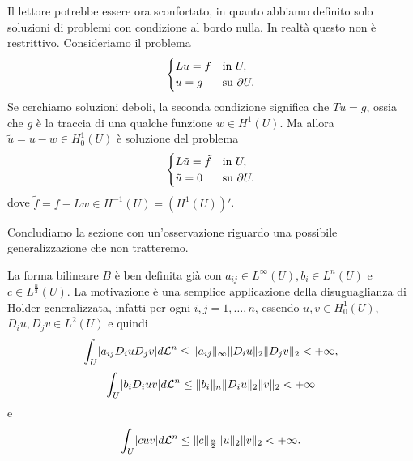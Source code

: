 \begin{osservazione}
	Il lettore potrebbe essere ora sconfortato, in quanto abbiamo definito solo soluzioni di problemi con condizione al bordo nulla. In realtà questo non è restrittivo. Consideriamo il problema
	\[ \begin{cases}
		Lu = f & \textup{in } U,\\
		u = g & \textup{su } \partial U.
	\end{cases} \]
	Se cerchiamo soluzioni deboli, la seconda condizione significa che $Tu = g$, ossia che $g$ è la traccia di una qualche funzione $w \in H^1(U)$. Ma allora $\tilde{u} = u-w \in H^1_0(U)$ è soluzione del problema
	\[ \begin{cases}
		L\tilde{u} = \tilde{f}& \textup{in } U,\\
		\tilde{u} = 0 & \textup{su } \partial U.
	\end{cases} \]
	dove $\tilde{f} = f - Lw \in H^{-1}(U) = (H^1(U))'$.
\end{osservazione}

Concludiamo la sezione con un'osservazione riguardo una possibile generalizzazione che non tratteremo.
\begin{osservazione}
	La forma bilineare $B$ è ben definita già con $a_{ij}\in L^\infty(U), b_i \in L^n(U)$ e $c \in L^{\frac{n}{2}}(U)$. La motivazione è una semplice applicazione della disuguaglianza di Holder generalizzata, infatti per ogni $i,j = 1,\dots,n$, essendo $u,v \in H^1_0(U)$, $D_iu, D_jv \in L^2(U)$ e quindi
	\[ \int_U \abs*{a_{ij}D_iuD_{j}v}d\mathcal{L}^n \le \norm{a_{ij}}_\infty \norm{D_iu}_{2}\norm{D_jv}_{2}<+\infty, \]
	\[ \int_U \abs*{b_i D_iuv}d\mathcal{L}^n \le \norm{b_i}_{n}\norm{D_iu}_{2}\norm{v}_{2}<+\infty \]
	e
	\[  \int_U \abs*{cuv}d\mathcal{L}^n \le \norm{c}_{\frac{n}{2}}\norm{u}_{2}\norm{v}_{2}<+\infty. \]
\end{osservazione}

